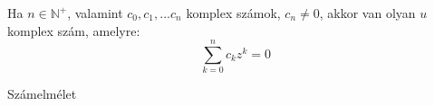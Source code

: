 \documentclass{beamer}
\newcommand{\mmedskip}{\vspace{0.5em}}
\begin{document}
\begin{frame}
\begin{tcolorbox}[title={Def.: Komplex számok}]
\end{tcolorbox}

\begin{tcolorbox}[title={Ész}]
\end{tcolorbox}

\begin{tcolorbox}[title={Alakok}]
\end{tcolorbox}

\begin{tcolorbox}[title={Ész}]
\end{tcolorbox}
\end{frame}

\begin{frame}
\begin{tcolorbox}[title={Def.: Moivre azonosságok}]
\end{tcolorbox}

\begin{tcolorbox}[title={Def.: Gyökvonás komplex számokból}]
\end{tcolorbox}

\begin{tcolorbox}[title={Def.: $n$-edik primitív egységgyökök}]
\end{tcolorbox}
\end{frame}

\begin{frame}
\begin{tcolorbox}[title={Tétel: Az algebra alaptétele}]
Ha $n \in \mathbb{N}^+$, valamint $c_0, c_1, ... c_n$ komplex számok, $c_n \neq 0$, akkor van olyan $u$ komplex szám, amelyre:\\
$$\sum_{k = 0}^n c_kz^k = 0$$
\end{tcolorbox}
\end{frame}

\begin{frame}[plain]
\begin{tcolorbox}[center, colback={myyellow}, coltext={black}, colframe={myyellow}]
    {\Huge Számelmélet}
    \mmedskip
\end{tcolorbox}
\end{frame}

\begin{frame}
\begin{tcolorbox}[title={Oszthatóság egységelemes integritási tarományban (Emlékeztető)}]
\end{tcolorbox}
\end{frame}
\end{document}
